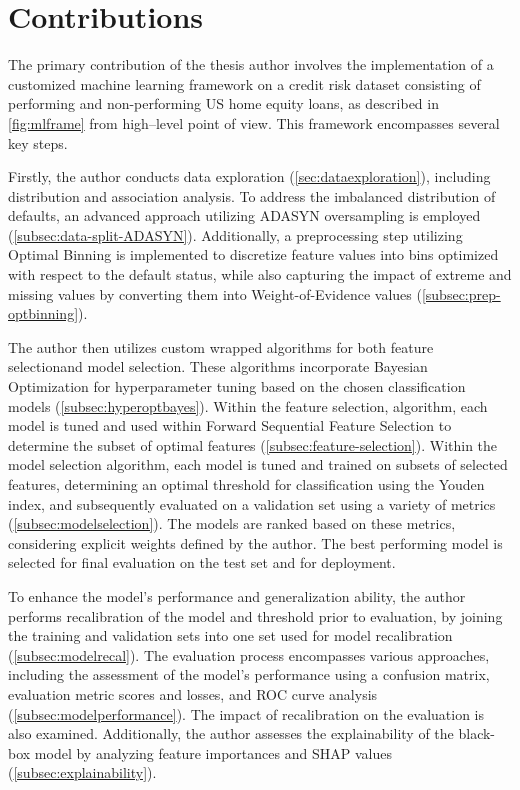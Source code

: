 \section{Contributions}
\label{sec:contributions}
The primary contribution of the thesis author involves the implementation of a customized machine learning framework on a credit risk dataset consisting of performing and non-performing US home equity loans, as described in \autoref{fig:mlframe} from high--level point of view. This framework encompasses several key steps.

Firstly, the author conducts data exploration (\autoref{sec:dataexploration}), including distribution and association analysis. To address the imbalanced distribution of defaults, an advanced approach utilizing ADASYN oversampling is employed (\autoref{subsec:data-split-ADASYN}).
Additionally, a preprocessing step utilizing Optimal Binning is implemented to discretize feature values into bins optimized with respect to the default status, while also capturing the impact of extreme and missing values by converting them into Weight-of-Evidence values (\autoref{subsec:prep-optbinning}).

The author then utilizes custom wrapped algorithms for both feature selectionand model selection.
These algorithms incorporate Bayesian Optimization for hyperparameter tuning based on the chosen classification models (\autoref{subsec:hyperoptbayes}).
Within the feature selection, algorithm, each model is tuned and used within Forward Sequential Feature Selection to determine the subset of optimal features  (\autoref{subsec:feature-selection}).
Within the model selection algorithm, each model is tuned and trained on subsets of selected features, determining an optimal threshold for classification using the Youden index, and subsequently evaluated on a validation set using a variety of metrics (\autoref{subsec:modelselection}).
The models are ranked based on these metrics, considering explicit weights defined by the author.
The best performing model is selected for final evaluation on the test set and for deployment.

To enhance the model's performance and generalization ability, the author performs recalibration of the model and threshold prior to evaluation, by joining the training and validation sets into one set used for model recalibration (\autoref{subsec:modelrecal}).
The evaluation process encompasses various approaches, including the assessment of the model's performance using a confusion matrix, evaluation metric scores and losses, and ROC curve analysis (\autoref{subsec:modelperformance}).
The impact of recalibration on the evaluation is also examined.
Additionally, the author assesses the explainability of the black-box model by analyzing feature importances and SHAP values (\autoref{subsec:explainability}).

